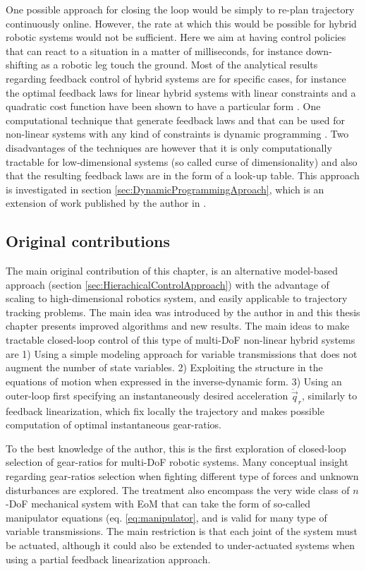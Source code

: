 One possible approach for closing the loop would be simply to re-plan trajectory continuously online. However, the rate at which this would be possible for hybrid robotic systems would not be sufficient. Here we aim at having control policies that can react to a situation in a matter of milliseconds, for instance down-shifting as a robotic leg touch the ground. Most of the analytical results regarding feedback control of hybrid systems are for specific cases, for instance the optimal feedback laws for linear hybrid systems with linear constraints and a quadratic cost function have been shown to have a particular form \cite{borrelli_dynamic_2005}. One computational technique that generate feedback laws and that can be used for non-linear systems with any kind of constraints is dynamic programming \cite{kirk_optimal_2004}. Two disadvantages of the techniques are however that it is only computationally tractable for low-dimensional systems (so called curse of dimensionality) and also that the resulting feedback laws are in the form of a look-up table. This approach is investigated in section \ref{sec:DynamicProgrammingAproach}, which is an extension of work published by the author in \cite{girard_practical_2016}.

\subsection{Original contributions}
\label{sec:maincont}

The main original contribution of this chapter, is an alternative model-based approach (section \ref{sec:HierachicalControlApproach}) with the advantage of scaling to high-dimensional robotics system, and easily applicable to trajectory tracking problems. The main idea was introduced by the author in \cite{girard_leveraging_2017} and this thesis chapter presents improved algorithms and new results. The main ideas to make tractable closed-loop control of this type of multi-DoF non-linear hybrid systems are 1) Using a simple modeling approach for variable transmissions that does not augment the number of state variables. 2) Exploiting the structure in the equations of motion when expressed in the inverse-dynamic form.  3) Using an outer-loop first specifying an instantaneously desired acceleration $\ddot{\vec{q}}_r$, similarly to feedback linearization, which fix locally the trajectory and makes possible computation of optimal instantaneous gear-ratios.

To the best knowledge of the author, this is the first exploration of closed-loop selection of gear-ratios for multi-DoF robotic systems. Many conceptual insight regarding gear-ratios selection when fighting different type of forces and unknown disturbances are explored. The treatment also encompass the very wide class of $n$-DoF mechanical system with EoM that can take the form of so-called manipulator equations (eq. \eqref{eq:manipulator}, and is valid for many type of variable transmissions. The main restriction is that each joint of the system must be actuated, although it could also be extended to under-actuated systems when using a partial feedback linearization approach. 


